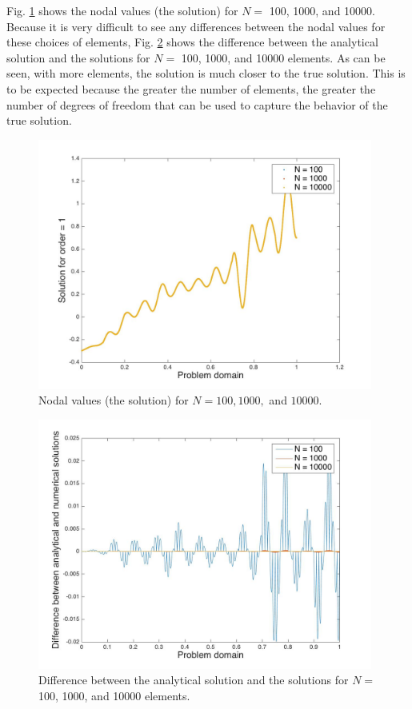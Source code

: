 \documentclass[10pt]{article}
\begin{document}
Fig. \ref{fig:NodalValues} shows the nodal values (the solution) for \(N=\) 100, 1000, and 10000. Because it is very difficult to see any differences between the nodal values for these choices of elements, Fig. \ref{fig:NodalValues2} shows the difference between the analytical solution and the solutions for \(N=\) 100, 1000, and 10000 elements. As can be seen, with more elements, the solution is much closer to the true solution. This is to be expected because the greater the number of elements, the greater the number of degrees of freedom that can be used to capture the behavior of the true solution. 

\begin{figure}[H]
  \centering
  \includegraphics[width=11cm]{Nplot.jpg}
  \caption{Nodal values (the solution) for \(N=100, 1000, \) and \(10000\).}
  \label{fig:NodalValues}
\end{figure}

\begin{figure}[H]
  \centering
  \includegraphics[width=11cm]{Nplot2.jpg}
  \caption{Difference between the analytical solution and the solutions for \(N=\) 100, 1000, and 10000 elements.}
  \label{fig:NodalValues2}
\end{figure}
\end{document}
